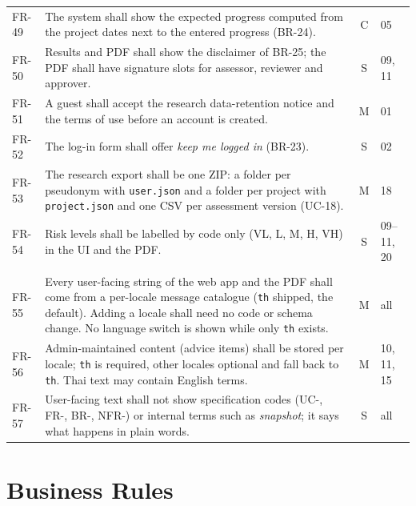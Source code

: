 \documentclass[11pt,a4paper]{article}
\begin{document}
\begin{longtable}{@{}l R{11.2cm} c l@{}}
FR-49 & The system shall show the expected progress computed from the project dates next to the entered progress (BR-24). & C & 05 \\
FR-50 & Results and PDF shall show the disclaimer of BR-25; the PDF shall have signature slots for assessor, reviewer and approver. & S & 09, 11 \\
FR-51 & A guest shall accept the research data-retention notice and the terms of use before an account is created. & M & 01 \\
FR-52 & The log-in form shall offer \emph{keep me logged in} (BR-23). & S & 02 \\
FR-53 & The research export shall be one ZIP: a folder per pseudonym with \texttt{user.json} and a folder per project with \texttt{project.json} and one CSV per assessment version (UC-18). & M & 18 \\
FR-54 & Risk levels shall be labelled by code only (VL, L, M, H, VH) in the UI and the PDF. & S & 09--11, 20 \\
\\
FR-55 & Every user-facing string of the web app and the PDF shall come from a per-locale message catalogue (\texttt{th} shipped, the default). Adding a locale shall need no code or schema change. No language switch is shown while only \texttt{th} exists. & M & all \\
FR-56 & Admin-maintained content (advice items) shall be stored per locale; \texttt{th} is required, other locales optional and fall back to \texttt{th}. Thai text may contain English terms. & M & 10, 11, 15 \\
FR-57 & User-facing text shall not show specification codes (UC-, FR-, BR-, NFR-) or internal terms such as \emph{snapshot}; it says what happens in plain words. & S & all \\
\bottomrule
\end{longtable}

\section{Business Rules}
\end{document}
